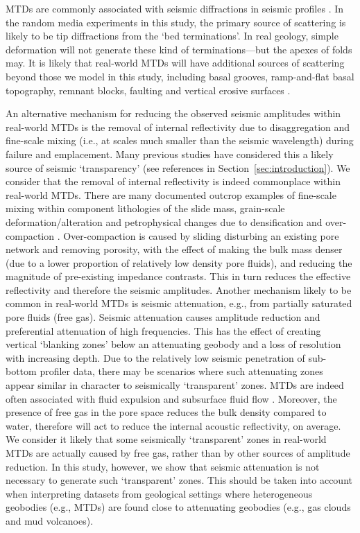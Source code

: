 \documentclass[se,manuscript]{copernicus}
\begin{document}
MTDs are commonly associated with seismic diffractions in seismic profiles \citep{urgeles_recurrent_1999,diviacco_late_2006,ford_seismic_2021}.
In the random media experiments in this study, the primary source of scattering is likely to be tip diffractions from the `bed terminations'.
In real geology, simple deformation will not generate these kind of terminations---but the apexes of folds may.
It is likely that real-world MTDs will have additional sources of scattering beyond those we model in this study, including basal grooves, ramp-and-flat basal topography, remnant blocks, faulting and vertical erosive surfaces \citep{bull_review_2009,ford_seismic_2021}.

An alternative mechanism for reducing the observed seismic amplitudes within real-world MTDs is the removal of internal reflectivity due to disaggregation and fine-scale mixing (i.e., at scales much smaller than the seismic wavelength) during failure and emplacement.
Many previous studies have considered this a likely source of seismic `transparency' (see references in Section~\ref{sec:introduction}).
We consider that the removal of internal reflectivity is indeed commonplace within real-world MTDs.
There are many documented outcrop examples of fine-scale mixing within component lithologies of the slide mass, grain-scale deformation/alteration and petrophysical changes due to densification and over-compaction \citep{ogata_carbonate_2014}.
Over-compaction is caused by sliding disturbing an existing pore network and removing porosity, with the effect of making the bulk mass denser (due to a lower proportion of relatively low density pore fluids), and reducing the magnitude of pre-existing impedance contrasts.
This in turn reduces the effective reflectivity and therefore the seismic amplitudes.
Another mechanism likely to be common in real-world MTDs is seismic attenuation, e.g., from partially saturated pore fluids (free gas).
Seismic attenuation causes amplitude reduction and preferential attenuation of high frequencies.
This has the effect of creating vertical `blanking zones' below an attenuating geobody and a loss of resolution with increasing depth.
Due to the relatively low seismic penetration of sub-bottom profiler data, there may be scenarios where such attenuating zones appear similar in character to seismically `transparent' zones.
MTDs are indeed often associated with fluid expulsion and subsurface fluid flow \citep{diviacco_late_2006, sun_free_2017, moernaut_evaluating_2020}.
Moreover, the presence of free gas in the pore space reduces the bulk density compared to water, therefore will act to reduce the internal acoustic reflectivity, on average.
We consider it likely that some seismically `transparent' zones in real-world MTDs are actually caused by free gas, rather than by other sources of amplitude reduction.
In this study, however, we show that seismic attenuation is not necessary to generate such `transparent' zones.
This should be taken into account when interpreting datasets from geological settings where heterogeneous geobodies (e.g., MTDs) are found close to attenuating geobodies (e.g., gas clouds and mud volcanoes).
\end{document}
